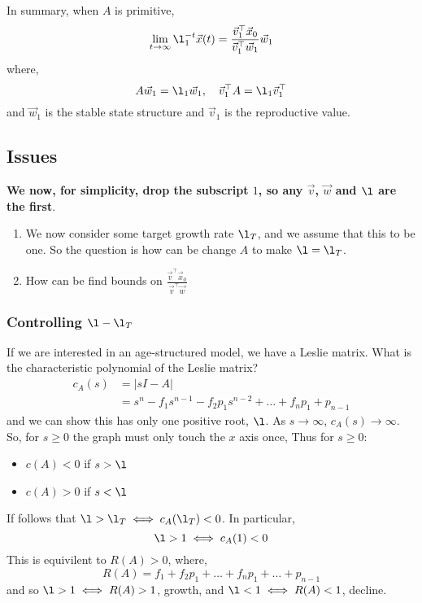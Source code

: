 \noindent
In summary, when $A$ is primitive,
$$ \lim_{t \to \infty} \l_1^{-t}\vec x(t) = \frac{\vec v_1^\top \vec x_0}{\vec v_1^\top\vec w_1}\vec w_1 $$
where,
$$ A\vec w_1 = \l_1\vec w_1, \quad \vec v_1^\top A = \l_1\vec v_1^\top $$
and $\vec w_1$ is the stable state structure and $\vec v_1$ is the reproductive value.\\

\subsection{Issues}

\textbf{We now, for simplicity, drop the subscript $1$, so any $\vec v$, $\vec w$ and $\l$ are the first}.\\

\noindent
\begin{enumerate}
  \item We now consider some target growth rate $\l_T$, and we assume that this to be one. So the question is how can be change $A$ to make $\l = \l_T$.
  \item How can be find bounds on $\frac{\vec v^\top \vec x_0}{\vec v^\top\vec w}$
\end{enumerate}

\subsubsection{Controlling $\l - \l_T$}
If we are interested in an age-structured model, we have a Leslie matrix. What is the characteristic polynomial of the Leslie matrix?
\begin{align*}
  c_A(s) &= |sI - A| \\
  &= s^n - f_1s^{n-1} - f_2p_1s^{n-2} + \dots + f_np_1 + p_{n-1}
\end{align*}
and we can show this has only one positive root, $\l$. As $s \to \infty$, $c_A(s) \to \infty$. So, for $s \ge 0$ the graph must only touch the $x$ axis once,
Thus for $s \ge 0$:
\begin{itemize}
  \item $c(A) < 0$ if $s > \l$
  \item $c(A) > 0$ if $s < \l$
\end{itemize}
If follows that $\l > \l_T \iff c_A(\l_T) < 0$. In particular,
$$ \l > 1 \iff c_A(1) < 0 $$
This is equivilent to $R(A) > 0$, where,
$$ R(A) = f_1 + f_2p_1 + \dots + f_np_1 + \dots + p_{n-1} $$ and so $\l > 1 \iff R(A) > 1$, growth, and $\l < 1 \iff R(A) < 1$, decline.

